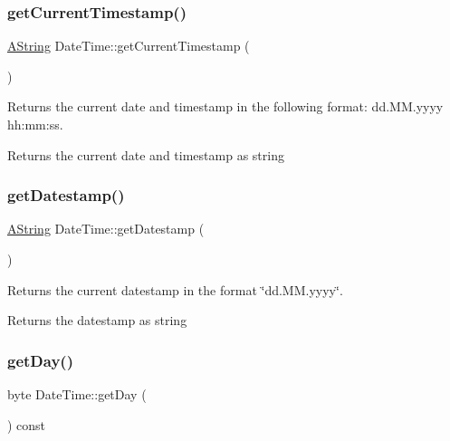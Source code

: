 \subsubsection{\texorpdfstring{getCurrentTimestamp()}{getCurrentTimestamp()}}
{\footnotesize\ttfamily \mbox{\hyperlink{class_a_string}{A\+String}} Date\+Time\+::get\+Current\+Timestamp (\begin{DoxyParamCaption}{ }\end{DoxyParamCaption})\hspace{0.3cm}{\ttfamily [static]}}



Returns the current date and timestamp in the following format\+: dd.\+M\+M.\+yyyy hh\+:mm\+:ss. 

\begin{DoxyReturn}{Returns}
the current date and timestamp as string 
\end{DoxyReturn}
\mbox{\label{class_date_time_ab8bbdb70e38a18cad9269b6f856f5634}} 
\subsubsection{\texorpdfstring{getDatestamp()}{getDatestamp()}}
{\footnotesize\ttfamily \mbox{\hyperlink{class_a_string}{A\+String}} Date\+Time\+::get\+Datestamp (\begin{DoxyParamCaption}{ }\end{DoxyParamCaption})\hspace{0.3cm}{\ttfamily [static]}}



Returns the current datestamp in the format \char`\"{}dd.\+M\+M.\+yyyy\char`\"{}. 

\begin{DoxyReturn}{Returns}
the datestamp as string 
\end{DoxyReturn}
\mbox{\label{class_date_time_a3ffb237255a73bbe9f8000d18c870ea8}} 
\subsubsection{\texorpdfstring{getDay()}{getDay()}}
{\footnotesize\ttfamily byte Date\+Time\+::get\+Day (\begin{DoxyParamCaption}{ }\end{DoxyParamCaption}) const}



